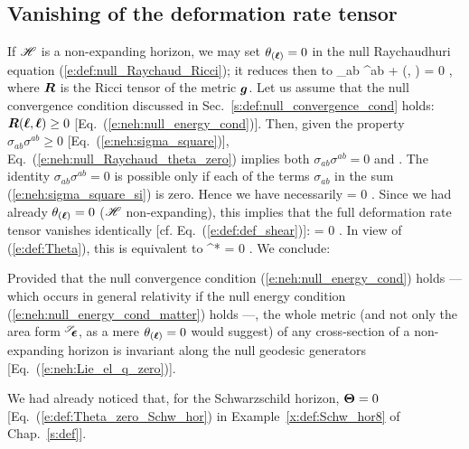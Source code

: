 \subsection{Vanishing of the deformation rate tensor} \label{s:neh:NEH_Theta_zero}

If $\mathscr{H}$ is a non-expanding horizon, we may set $\theta_{(\bm{\ell})}=0$
in the null Raychaudhuri equation (\ref{e:def:null_Raychaud_Ricci}); it reduces then
to
\be \label{e:neh:null_Raychaud_theta_zero}
    \sigma_{ab} \sigma^{ab} + (\wl, \wl) = 0 ,
\ee
where $\bm{R}$ is the Ricci tensor of the metric $\bm{g}$.
Let us assume that the null convergence condition
discussed in Sec.~\ref{s:def:null_convergence_cond}
holds: $\bm{R}(\bm{\ell}, \bm{\ell}) \geq 0$ [Eq.~(\ref{e:neh:null_energy_cond})].
Then, given the property $\sigma_{ab} \sigma^{ab} \geq 0$
[Eq.~(\ref{e:neh:sigma_square})],
Eq.~(\ref{e:neh:null_Raychaud_theta_zero}) implies both
$\sigma_{ab} \sigma^{ab}  = 0$
and
\be \label{e:neh:R_l_l_zero}
    .
\ee
The identity $\sigma_{ab} \sigma^{ab} = 0$ is possible only if each of
the terms $\sigma_{ab}$ in the sum (\ref{e:neh:sigma_square_si}) is zero. Hence we have necessarily
\be
    \w{\sigma} = 0 .
\ee
Since we had already $\theta_{(\bm{\ell})}=0$ ($\mathscr{H}$ non-expanding), this implies that the full deformation rate tensor
vanishes identically [cf. Eq.~(\ref{e:def:def_shear})]:
\be
    \w{\Theta} = 0 .
\ee
In view of (\ref{e:def:Theta}), this is equivalent to
\be \label{e:neh:Lie_el_q_zero}
     ^* \Lie{\el}  = 0 .
\ee
We conclude:
\begin{prop}
\label{p:neh:invariance_of_2metric}
Provided that the null convergence condition (\ref{e:neh:null_energy_cond})
holds --- which occurs in general relativity if the
null energy condition
(\ref{e:neh:null_energy_cond_matter})
holds ---,
the whole metric (and not only the area form
${}^{\mathscr{S}}\!\!\bm{\epsilon}$, as a mere $\theta_{(\bm{\ell})}=0$ would suggest) of any cross-section
of a non-expanding horizon is invariant along the null geodesic generators
[Eq.~(\ref{e:neh:Lie_el_q_zero})].
\end{prop}

\begin{example}
We had already noticed that, for the Schwarzschild horizon, $\bm{\Theta}=0$
[Eq.~(\ref{e:def:Theta_zero_Schw_hor}) in Example~\ref{x:def:Schw_hor8}
of Chap.~\ref{s:def}].
\end{example}

